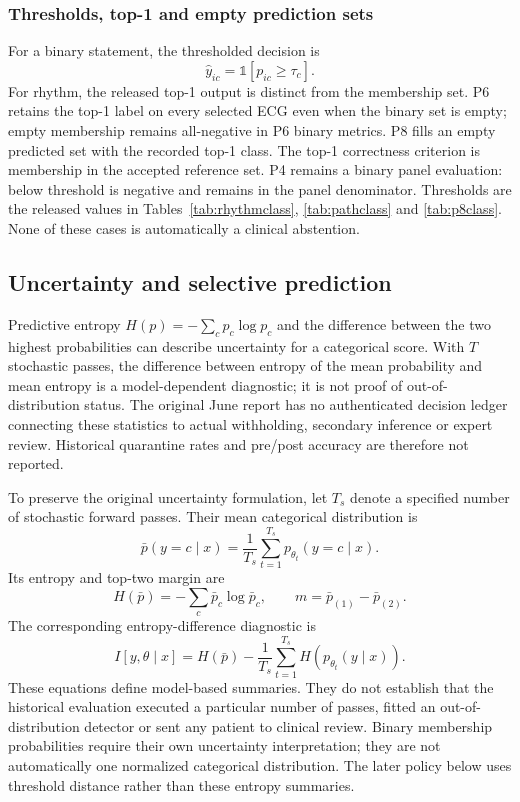 \documentclass[life,article,submit,moreauthors]{Definitions/mdpi}
\begin{document}
\subsubsection{Thresholds, top-1 and empty prediction sets}
\label{sec:decision}
For a binary statement, the thresholded decision is
\begin{equation}
\hat y_{ic}=\mathbb{1}[p_{ic}\ge \tau_c].
\end{equation}
For rhythm, the released top-1 output is distinct from the membership set. P6 retains the top-1 label on every selected ECG even when the binary set is empty; empty membership remains all-negative in P6 binary metrics. P8 fills an empty predicted set with the recorded top-1 class. The top-1 correctness criterion is membership in the accepted reference set. P4 remains a binary panel evaluation: below threshold is negative and remains in the panel denominator. Thresholds are the released values in Tables~\ref{tab:rhythmclass}, \ref{tab:pathclass} and \ref{tab:p8class}. None of these cases is automatically a clinical abstention.

\subsection{Uncertainty and selective prediction}
\label{sec:selective}
Predictive entropy $H(p)=-\sum_c p_c\log p_c$ and the difference between the two highest probabilities can describe uncertainty for a categorical score. With $T$ stochastic passes, the difference between entropy of the mean probability and mean entropy is a model-dependent diagnostic; it is not proof of out-of-distribution status. The original June report has no authenticated decision ledger connecting these statistics to actual withholding, secondary inference or expert review. Historical quarantine rates and pre/post accuracy are therefore not reported.

To preserve the original uncertainty formulation, let $T_s$ denote a specified number of stochastic forward passes. Their mean categorical distribution is
\begin{equation}
\bar p(y=c\mid x)=\frac{1}{T_s}\sum_{t=1}^{T_s}p_{\theta_t}(y=c\mid x).
\end{equation}
Its entropy and top-two margin are
\begin{equation}
H(\bar p)=-\sum_c\bar p_c\log\bar p_c,\qquad m=\bar p_{(1)}-\bar p_{(2)}.
\end{equation}
The corresponding entropy-difference diagnostic is
\begin{equation}
I[y,\theta\mid x]=H(\bar p)-\frac{1}{T_s}\sum_{t=1}^{T_s}H(p_{\theta_t}(y\mid x)).
\end{equation}
These equations define model-based summaries. They do not establish that the historical evaluation executed a particular number of passes, fitted an out-of-distribution detector or sent any patient to clinical review. Binary membership probabilities require their own uncertainty interpretation; they are not automatically one normalized categorical distribution. The later policy below uses threshold distance rather than these entropy summaries.
\end{document}
